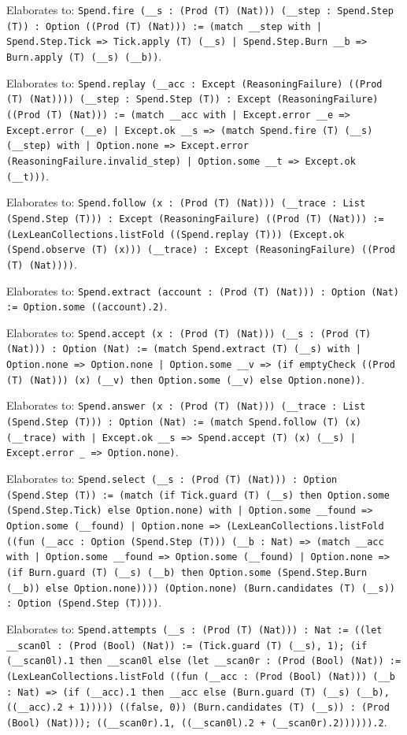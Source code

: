 \documentclass[11pt]{article}
\begin{document}
\noindent Elaborates to: \texttt{Spend.fire (\_\_s : (Prod (T) (Nat))) (\_\_step : Spend.Step (T)) : Option ((Prod (T) (Nat))) := (match \_\_step with | Spend.Step.Tick => Tick.apply (T) (\_\_s) | Spend.Step.Burn \_\_b => Burn.apply (T) (\_\_s) (\_\_b))}.\par
\noindent Elaborates to: \texttt{Spend.replay (\_\_acc : Except (ReasoningFailure) ((Prod (T) (Nat)))) (\_\_step : Spend.Step (T)) : Except (ReasoningFailure) ((Prod (T) (Nat))) := (match \_\_acc with | Except.error \_\_e => Except.error (\_\_e) | Except.ok \_\_s => (match Spend.fire (T) (\_\_s) (\_\_step) with | Option.none => Except.error (ReasoningFailure.invalid\_step) | Option.some \_\_t => Except.ok (\_\_t)))}.\par
\noindent Elaborates to: \texttt{Spend.follow (x : (Prod (T) (Nat))) (\_\_trace : List (Spend.Step (T))) : Except (ReasoningFailure) ((Prod (T) (Nat))) := (LexLeanCollections.listFold ((Spend.replay (T))) (Except.ok (Spend.observe (T) (x))) (\_\_trace) : Except (ReasoningFailure) ((Prod (T) (Nat))))}.\par
\noindent Elaborates to: \texttt{Spend.extract (account : (Prod (T) (Nat))) : Option (Nat) := Option.some ((account).2)}.\par
\noindent Elaborates to: \texttt{Spend.accept (x : (Prod (T) (Nat))) (\_\_s : (Prod (T) (Nat))) : Option (Nat) := (match Spend.extract (T) (\_\_s) with | Option.none => Option.none | Option.some \_\_v => (if emptyCheck ((Prod (T) (Nat))) (x) (\_\_v) then Option.some (\_\_v) else Option.none))}.\par
\noindent Elaborates to: \texttt{Spend.answer (x : (Prod (T) (Nat))) (\_\_trace : List (Spend.Step (T))) : Option (Nat) := (match Spend.follow (T) (x) (\_\_trace) with | Except.ok \_\_s => Spend.accept (T) (x) (\_\_s) | Except.error \_ => Option.none)}.\par
\noindent Elaborates to: \texttt{Spend.select (\_\_s : (Prod (T) (Nat))) : Option (Spend.Step (T)) := (match (if Tick.guard (T) (\_\_s) then Option.some (Spend.Step.Tick) else Option.none) with | Option.some \_\_found => Option.some (\_\_found) | Option.none => (LexLeanCollections.listFold ((fun (\_\_acc : Option (Spend.Step (T))) (\_\_b : Nat) => (match \_\_acc with | Option.some \_\_found => Option.some (\_\_found) | Option.none => (if Burn.guard (T) (\_\_s) (\_\_b) then Option.some (Spend.Step.Burn (\_\_b)) else Option.none)))) (Option.none) (Burn.candidates (T) (\_\_s)) : Option (Spend.Step (T))))}.\par
\noindent Elaborates to: \texttt{Spend.attempts (\_\_s : (Prod (T) (Nat))) : Nat := ((let \_\_scan0l : (Prod (Bool) (Nat)) := (Tick.guard (T) (\_\_s), 1); (if (\_\_scan0l).1 then \_\_scan0l else (let \_\_scan0r : (Prod (Bool) (Nat)) := (LexLeanCollections.listFold ((fun (\_\_acc : (Prod (Bool) (Nat))) (\_\_b : Nat) => (if (\_\_acc).1 then \_\_acc else (Burn.guard (T) (\_\_s) (\_\_b), ((\_\_acc).2 + 1))))) ((false, 0)) (Burn.candidates (T) (\_\_s)) : (Prod (Bool) (Nat))); ((\_\_scan0r).1, ((\_\_scan0l).2 + (\_\_scan0r).2)))))).2}.\par
\end{document}
